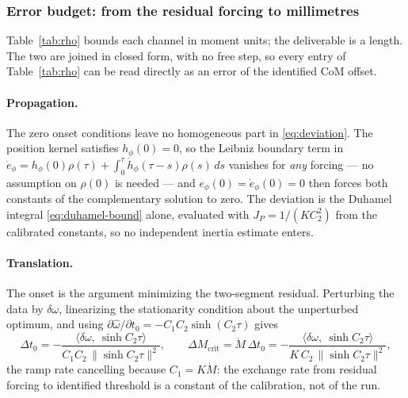 \subsubsection{Error budget: from the residual forcing to millimetres}
\label{sec:fid-budget}

Table~\ref{tab:rho} bounds each channel in moment units; the deliverable
is a length. The two are joined in closed form, with no free step, so
every entry of Table~\ref{tab:rho} can be read directly as an error of
the identified CoM offset.

\paragraph{Propagation.} The zero onset conditions leave no homogeneous
part in \eqref{eq:deviation}. The position kernel satisfies
$h_\phi(0)=0$, so the Leibniz boundary term in
$\dot e_\phi = h_\phi(0)\rho(\tau)
 + \int_0^\tau \dot h_\phi(\tau{-}s)\rho(s)\,ds$
vanishes for \emph{any} forcing --- no assumption on $\rho(0)$ is needed
--- and $e_\phi(0)=\dot e_\phi(0)=0$ then forces both constants of the
complementary solution to zero. The deviation is the Duhamel integral
\eqref{eq:duhamel-bound} alone, evaluated with
$J_P = 1/(K C_2^2)$ from the calibrated constants, so no independent
inertia estimate enters.

\paragraph{Translation.} The onset is the argument minimizing the
two-segment residual. Perturbing the data by $\delta\omega$,
linearizing the stationarity condition about the unperturbed optimum,
and using
$\partial\hat\omega/\partial t_0 = -C_1 C_2 \sinh(C_2\tau)$ gives
\begin{equation}
  \Delta t_0 = -\frac{\langle\delta\omega,\ \sinh C_2\tau\rangle}
                     {C_1C_2\,\|\sinh C_2\tau\|^2},
  \qquad
  \Delta M_{\mathrm{crit}} = \dot M\,\Delta t_0
    = -\frac{\langle\delta\omega,\ \sinh C_2\tau\rangle}
            {K\,C_2\,\|\sinh C_2\tau\|^2},
  \label{eq:onset-translation}
\end{equation}
the ramp rate cancelling because $C_1 = K\dot M$: the exchange rate from
residual forcing to identified threshold is a constant of the
calibration, not of the run.

